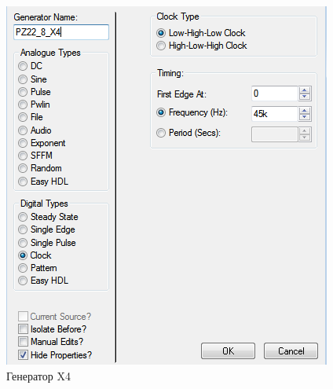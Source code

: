 \documentclass{article}
\begin{document}
\begin{normalsize}
	\begin{figure}[H]
		\begin{minipage}[h]{0.47\linewidth}
			\begin{center}
				\includegraphics[width=1\linewidth]{g4} 
				\caption{Генератор  X4}
			\end{center} 
		\end{minipage}
		\hfill
		\vspace{0.2 cm}
		\begin{minipage}[h]{0.47\linewidth}
			\begin{center}

\end{center}
\end{minipage}
\end{figure}
\end{normalsize}
\end{document}
